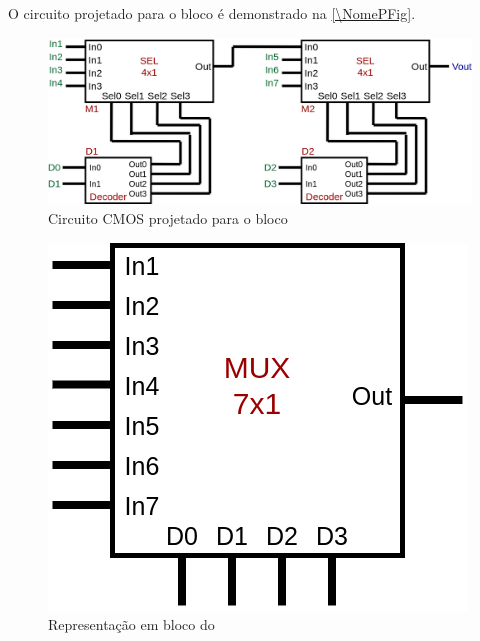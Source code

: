 O circuito projetado para o bloco \'e demonstrado na \autoref{\NomePFig}.

\begin{figure}[htbp]
 \label{NomePFig}
 \centering
    \centering
    \caption{Circuito CMOS projetado para o bloco \NomeBloco} \label{\NomePFig}
    \includegraphics[scale=0.3]{Circuitos/mux7x1.png}
\end{figure}

\begin{figure}[htbp]
 \label{NomeSFig}
 \centering
    \centering
    \caption{Representa{\c c}\~ao em bloco do \NomeBloco} \label{NomeSFig}
    \includegraphics[scale=0.5]{Circuitos/mux7x1_block.png}
\end{figure}
\clearpage